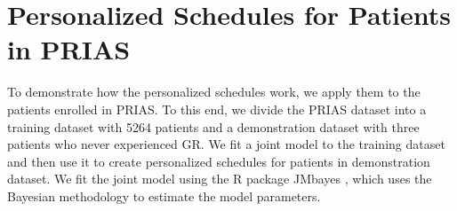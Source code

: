 
\section{Personalized Schedules for Patients in PRIAS}
\label{sec : pers_schedule_PRIAS}
To demonstrate how the personalized schedules work, we apply them to the patients enrolled in PRIAS. To this end, we divide the PRIAS dataset into a training dataset with 5264 patients and a demonstration dataset with three patients who never experienced GR. We fit a joint model to the training dataset and then use it to create personalized schedules for patients in demonstration dataset. We fit the joint model using the R package JMbayes \citep{rizopoulosJMbayes}, which uses the Bayesian methodology to estimate the model parameters.

